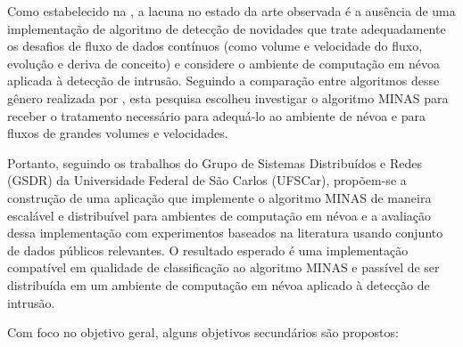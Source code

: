 
Como estabelecido na , a lacuna no estado da arte observada é
a ausência de uma implementação de algoritmo de detecção de
novidades que trate adequadamente os desafios de fluxo de dados contínuos
(como volume e velocidade do fluxo, evolução e deriva de conceito)
e considere o ambiente de computação em névoa aplicada à detecção de
intrusão.
Seguindo a comparação entre algoritmos desse gênero realizada por
, esta pesquisa escolheu investigar o algoritmo MINAS \cite{Faria2016minas}
para receber o tratamento necessário para adequá-lo ao ambiente de névoa e para
fluxos de grandes volumes e velocidades.


Portanto, seguindo os trabalhos do Grupo de Sistemas Distribuídos e Redes
(GSDR) da Universidade Federal de São Carlos (UFSCar), propõem-se a construção
de uma aplicação que implemente o algoritmo MINAS
de maneira escalável e distribuível para ambientes de computação em névoa e a avaliação
dessa implementação com experimentos baseados na literatura usando conjunto de dados
públicos relevantes.
O resultado esperado é uma implementação compatível em qualidade de
classificação ao algoritmo MINAS e passível de ser distribuída em um ambiente
de computação em névoa aplicado à detecção de intrusão.



% 

Com foco no objetivo geral, alguns objetivos secundários são propostos:

